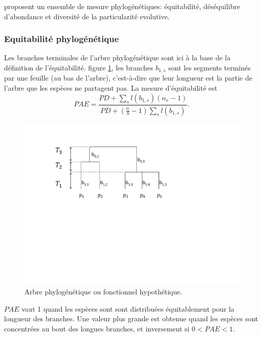 \documentclass[
  11pt,
  french,
  a4paper,
  extrafontsizes,onecolumn,openright
  ]{memoir}
\begin{document}
\textcite{Cadotte2010} proposent un ensemble de mesure phylogénétiques: équitabilité, déséquilibre d'abondance et diversité de la particularité evolutive.

\hypertarget{equitabilituxe9-phyloguxe9nuxe9tique}{%
\subsubsection{Equitabilité phylogénétique}\label{equitabilituxe9-phyloguxe9nuxe9tique}}

Les branches terminales de l'arbre phylogénétique sont ici à la base de la définition de l'équitabilité.
figure \ref{fig:ArbreA3}, les branches \(b_{1,s}\) sont les segments terminés par une feuille (au bas de l'arbre), c'est-à-dire que leur longueur est la partie de l'arbre que les espèces ne partagent pas.
La mesure d'équitabilité est
\begin{equation}
  \mathit{PAE} = \frac{\mathit{PD} + \sum_s{l(b_{1,s})(n_s-1)}}{\mathit{PD} + (\frac{n}{S}-1)\sum_s{l(b_{1,s})} }.
\end{equation}

\scriptsize

\begin{figure}

{\centering \includegraphics[width=0.8\linewidth]{images/ArbreA} 

}

\caption{Arbre phylogénétique ou fonctionnel hypothétique.}\label{fig:ArbreA3}
\end{figure}

\normalsize

\(\mathit{PAE}\) vaut 1 quand les espèces sont sont distribuées équitablement pour la longueur des branches.
Une valeur plus grande est obtenue quand les espèces sont concentrées au bout des longues branches, et inversement si \(0<\mathit{PAE}<1\).
\end{document}
